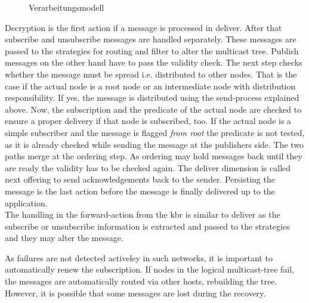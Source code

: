 \begin{figure}[htbp]
\centering
{}
\caption{Verarbeitungsmodell}
\label{fig:processing_model}
\end{figure}

Decryption is the first action if a message is processed in deliver. After that subscribe and unsubscribe messages are handled separately. These messages are passed to the strategies for routing and filter to alter the multicast tree. Publish messages on the other hand have to pass the validity check. The next step checks whether the message must be spread i.e. distributed to other nodes. That is the case if the actual node is a root node or an intermediate node with distribution responsibility. If yes, the message is distributed using the send-process explained above. Now, the subscription and the predicate of the actual node are checked to ensure a proper delivery if that node is subscribed, too. If the actual node is a simple subscriber and the message is flagged \emph{from root} the predicate is not tested, as it is already checked while sending the message at the publishers side. The two paths merge at the ordering step. As ordering may hold messages back until they are ready the validity has to be checked again. The deliver dimension is called next offering to send acknowledgements back to the sender. Persisting the message is the last action before the message is finally delivered up to the application.\\
The handling in the forward-action from the \ac{kbr} is similar to deliver as the subscribe or unsubscribe information is extracted and passed to the strategies and they may alter the message.

As failures are not detected activeley in such networks, it is important to automatically renew the subscription. If nodes in the logical multicast-tree fail, the messages are automatically routed via other hosts, rebuilding the tree. However, it is possible that some messages are lost during the recovery.

